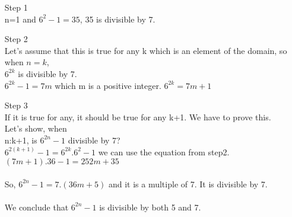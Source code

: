 \documentclass[12pt]{article}
\begin{document}
\begin{enumerate}
    \item[Step 1 ]\\
    n=1 and $6^2-1 = 35$, 35 is divisible by 7.\\
    \item[Step 2]\\
Let's assume that this is true for any k which is an element of the domain, so when $n=k$,\\ $6^{2k}$ is divisible by 7.\\
    $6^{2k} - 1 = 7m$ which m is a positive integer. $6^{2k} = 7m + 1$
    \item[Step 3]\\ 
If it is true for any, it should be true for any k+1. We have to prove this. Let's show, when\\ n:k+1, is $6^{2n}-1$ divisible by 7?\\
    $6^{2(k+1)}-1 = 6^{2k}.6^2 - 1$ we can use the equation from step2. \\
    $(7m+1).36-1 = 252m+35$\\
    \\
    So, $6^{2n}-1 = 7.(36m+5)$ and it is a multiple of 7. It is divisible by 7. \\
    \\
     We conclude that $6^{2n}-1$ is divisible by both 5 and 7.
    
\end{enumerate}
\end{document}
